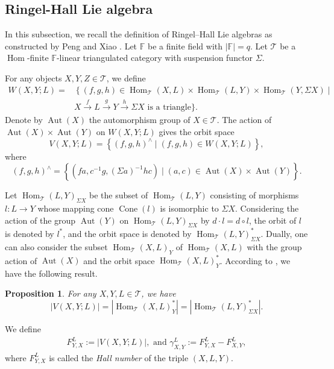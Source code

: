 \documentclass[12pt,reqno]{amsart}
\numberwithin{equation}{section}
\newcommand{\Aut}{\operatorname{Aut}\nolimits}
\newcommand{\Hom}{\operatorname{Hom}\nolimits}
\newtheorem{proposition}[theorem]{Proposition}
\begin{document}
	\subsection{Ringel-Hall Lie algebra}\label{ss-R-H-Lie}
	In this subsection, we recall the definition of Ringel--Hall Lie algebras as constructed by Peng and Xiao \cite{PX00-Tri-Cat-Kac}.
	Let $\mathbb{F}$ be a finite field with $|\mathbb{F}|=q$. Let $\mathcal{T}$ be a $\Hom$-finite $\mathbb{F}$-linear triangulated category with suspension functor $\Sigma$. 
	
	For any objects $X,Y,Z\in\mathcal{T}$, we define
	\[
	\begin{aligned} W(X, Y ; L)= & \left\{(f, g, h) \in \operatorname{Hom}_{\mathcal{T}}(X, L) \times \operatorname{Hom}_{\mathcal{T}}(L, Y) \times \operatorname{Hom}_{\mathcal{T}}(Y, \Sigma X)\mid\right. \\ & X \xrightarrow{f} L \xrightarrow{g} Y \xrightarrow{h} \Sigma X \text { is a triangle}\} .\end{aligned}
	\]
	Denote by $\operatorname{Aut}(X)$ the automorphism group of $X\in\mathcal{T}$. 
	The action of $\operatorname{Aut}(X) \times \operatorname{Aut}(Y)$ on $W(X, Y ; L)$ gives the orbit space
	\[
	V(X, Y ; L)=\left\{(f, g, h)^{\wedge} \mid(f, g, h) \in W(X, Y ; L)\right\},
	\]
	where
	\[
	(f, g, h)^{\wedge}=\left\{\left(fa,  c^{-1}g, (\Sigma a)^{-1}h c\right) \mid(a, c) \in \operatorname{Aut}(X) \times \operatorname{Aut}(Y)\right\} .
	\]
	
	Let $\Hom_{\mathcal{T}}(L,Y)_{\Sigma X}$ be the subset of $\Hom_{\mathcal{T}}(L,Y)$ consisting of morphisms $l:L\rightarrow Y$ whose mapping cone $\operatorname{Cone} (l)$ is isomorphic to $\Sigma X$. Considering the action of the group $\Aut(Y)$ on $\Hom_{\mathcal{T}}(L,Y)_{\Sigma X}$ by $d\cdot l=d\circ l$, the orbit of $l$ is denoted by $l^*$, and the orbit space is denoted by $\Hom_{\mathcal{T}}(L,Y)_{\Sigma X}^*$. Dually, one can also consider the subset $\Hom_{\mathcal{T}}(X,L)_Y$ of $\Hom_{\mathcal{T}}(X,L)$ with the group action of $\Aut (X)$ and the orbit space $\Hom_{\mathcal{T}}(X,L)_Y^*$. According to \cite[Proposition 4.1]{XX08-Hall-tri-cat}, we have the following result. 
	\begin{proposition}\label{pro:Hall number}
		For any $X,Y,L\in\mathcal{T}$, we have 
		$$|V(X,Y;L)|=|\Hom_{\mathcal{T}}(X,L)_Y^*|=|\Hom_{\mathcal{T}}(L,Y)_{\Sigma X}^*|.$$
	\end{proposition}
	
	
	We define 
	\begin{align}F_{Y,X}^L:=|V(X,Y;L)|,\text{ and }\gamma_{X,Y}^L:=F_{Y,X}^L-F_{X,Y}^L,
	\end{align}
	where $F_{Y,X}^L$ is called the {\it Hall number} of the triple $(X,L,Y)$.
	
\end{document}
